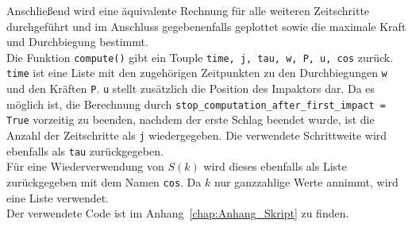 Anschließend wird eine äquivalente Rechnung für alle weiteren Zeitschritte durchgeführt und im Anschluss gegebenenfalls geplottet sowie die maximale Kraft und Durchbiegung bestimmt.\\
Die Funktion  \texttt{compute()} gibt ein Touple \texttt{time, j, tau, w, P, u, cos} zurück.  \texttt{time} ist eine Liste mit den zugehörigen Zeitpunkten zu den Durchbiegungen \texttt{w} und den Kräften \texttt{P}. \texttt{u} stellt zusätzlich die Position des Impaktors dar. Da es möglich ist, die Berechnung durch \texttt{stop\_computation\_after\_first\_impact = True} vorzeitig zu beenden, nachdem der erste Schlag beendet wurde, ist die Anzahl der Zeitschritte als \texttt{j} wiedergegeben. Die verwendete Schrittweite wird ebenfalls als \texttt{tau} zurückgegeben.\\
Für eine Wiederverwendung von $S(k)$ wird dieses ebenfalls als Liste zurückgegeben mit dem Namen \texttt{cos}. Da $k$ nur ganzzahlige Werte annimmt, wird eine Liste verwendet.\\
Der verwendete Code ist im Anhang~\ref{chap:Anhang_Skript} zu finden.



